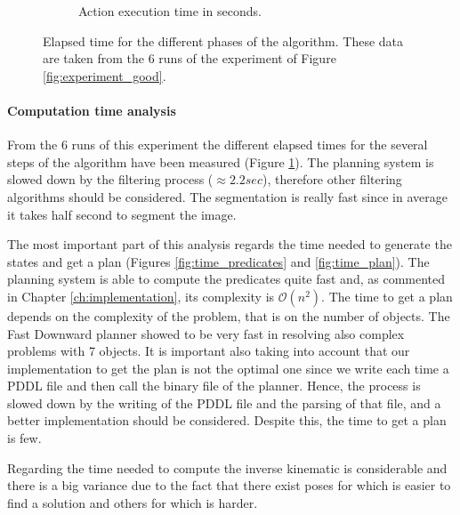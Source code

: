 \begin{figure}[tb]
\begin{subfigure}[t]{0.45\textwidth}
\caption{Action execution time in seconds.}
\end{subfigure}
\caption{Elapsed time for the different phases of the algorithm. These data are taken from the 6 runs of the experiment of Figure \ref{fig:experiment_good}.}\label{fig:time_results}
\end{figure}


\paragraph{Computation time analysis}
From the 6 runs of this experiment the different elapsed times for the several steps of the algorithm have been measured (Figure \ref{fig:time_results}). The planning system is slowed down by the filtering process ($\approx 2.2sec$), therefore other filtering algorithms should be considered. The segmentation is really fast since in average it takes half second to segment the image.

The most important part of this analysis regards the time needed to generate the states and get a plan (Figures \ref{fig:time_predicates} and \ref{fig:time_plan}). The planning system is able to compute the predicates quite fast and, as commented in Chapter \ref{ch:implementation}, its complexity is $\mathcal{O}(n^2)$. The time to get a plan depends on the complexity of the problem, that is on the number of objects. The Fast Downward planner showed to be very fast in resolving also complex problems with 7 objects. It is important also taking into account that our implementation to get the plan is not the optimal one since we write each time a PDDL file and then call the binary file of the planner. Hence, the process is slowed down by the writing of the PDDL file and the parsing of that file, and a better implementation should be considered. Despite this, the time to get a plan is few.

Regarding the time needed to compute the inverse kinematic is considerable and there is a big variance due to the fact that there exist poses for which is easier to find a solution and others for which is harder. 

